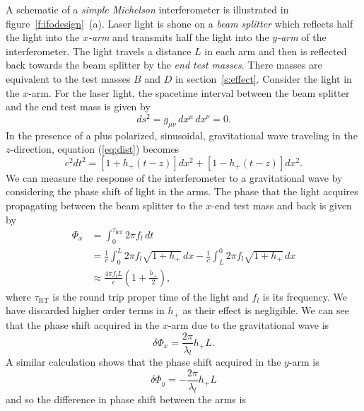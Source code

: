 A schematic of a \emph{simple Michelson} interferometer is illustrated in
figure~\ref{f:ifodesign}~(a).  Laser light is shone on a \emph{beam
splitter} which reflects half the light into the \emph{$x$-arm} and transmits
half the light into the \emph{$y$-arm} of the interferometer. The light
travels a distance $L$ in each arm and then is reflected back towards the beam
splitter by the \emph{end test masses}. There masses are equivalent to the
test masses $B$ and $D$ in section~\ref{s:effect}.  Consider the light in the
$x$-arm. For the laser light, the spacetime interval between the beam splitter
and the end test mass is given by
\begin{equation}
ds^2 = g_{\mu\nu}\, dx^\mu\, dx^\nu = 0.
\label{eq:dist}
\end{equation}
In the presence of a plus polarized, sinusoidal, gravitational wave traveling
in the $z$-direction, equation (\ref{eq:dist}) becomes
\begin{equation}
c^2 dt^2 = \left[1 + h_{+}(t-z)\right] dx^2 + \left[1 - h_{+}(t-z)\right] dx^2.
\end{equation}
We can measure the response of the interferometer to a gravitational wave by
considering the phase shift of light in the arms. The phase that the light
acquires propagating between the beam splitter to the $x$-end test mass and
back is given by\cite{Saulson:1994}
\begin{equation}
\begin{split}
\Phi_x &= \int_0^{\tau_\mathrm{RT}} 2\pi f_l\, dt \\
&= \frac{1}{c} \int_0^L 2\pi f_l \sqrt{1 + h_{+}}\,dx -
\frac{1}{c} \int_L^0 2\pi f_l \sqrt{1 + h_{+}}\,dx \\
&\approx \frac{4\pi f_l L}{c} \left(1 + \frac{h_{+}}{2}\right),
\end{split}
\end{equation}
where $\tau_\mathrm{RT}$ is the round trip proper time of the light and $f_l$ is
its frequency. We have discarded higher order terms in $h_+$ as their effect
is negligible.  We can see that the phase shift acquired in the $x$-arm due to the
gravitational wave is
\begin{equation}
\delta \Phi_x = \frac{2\pi}{\lambda_l} h_{+} L.
\end{equation}
A similar calculation shows that the phase shift acquired in the $y$-arm is
\begin{equation}
\delta \Phi_y = - \frac{2\pi}{\lambda_l} h_{+} L
\end{equation}
and so the difference in phase shift between the arms is
